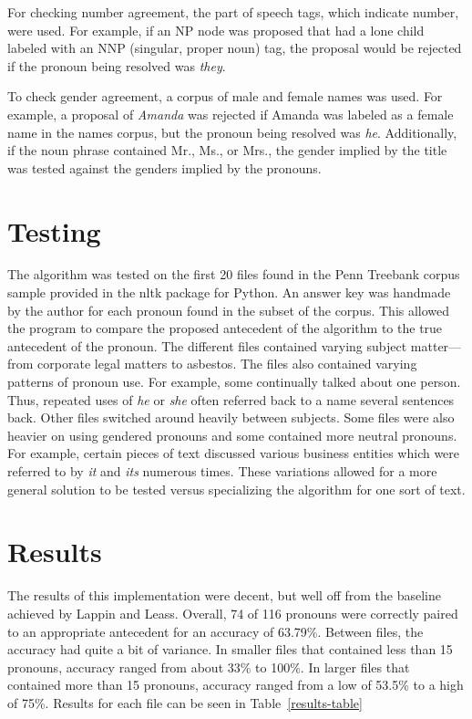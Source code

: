 \documentclass[11pt]{article}
\begin{document}
For checking number agreement, the part of speech tags, which indicate number, were used. For example, if an NP node was proposed that had a lone child labeled with an NNP (singular, proper noun) tag, the proposal would be rejected if the pronoun being resolved was \textit{they}.

To check gender agreement, a corpus of male and female names was used. For example, a proposal of \textit{Amanda} was rejected if Amanda was labeled as a female name in the names corpus, but the pronoun being resolved was \textit{he}. Additionally, if the noun phrase contained Mr., Ms., or Mrs., the gender implied by the title was tested against the genders implied by the pronouns.

\section{Testing}
The algorithm was tested on the first 20 files found in the Penn Treebank corpus sample provided in the nltk package for Python. An answer key was handmade by the author for each pronoun found in the subset of the corpus. This allowed the program to compare the proposed antecedent of the algorithm to the true antecedent of the pronoun. The different files contained varying subject matter---from corporate legal matters to asbestos. The files also contained varying patterns of pronoun use. For example, some continually talked about one person. Thus, repeated uses of \textit{he} or \textit{she} often referred back to a name several sentences back. Other files switched around heavily between subjects. Some files were also heavier on using gendered pronouns and some contained more neutral pronouns. For example, certain pieces of text discussed various business entities which were referred to by \textit{it} and \textit{its} numerous times. These variations allowed for a more general solution to be tested versus specializing the algorithm for one sort of text.

\section{Results}
The results of this implementation were decent, but well off from the baseline achieved by Lappin and Leass. Overall, 74 of 116 pronouns were correctly paired to an appropriate antecedent for an accuracy of 63.79\%. Between files, the accuracy had quite a bit of variance. In smaller files that contained less than 15 pronouns, accuracy ranged from about 33\% to 100\%. In larger files that contained more than 15 pronouns, accuracy ranged from a low of 53.5\% to a high of 75\%. Results for each file can be seen in Table~\ref{results-table}
\end{document}
